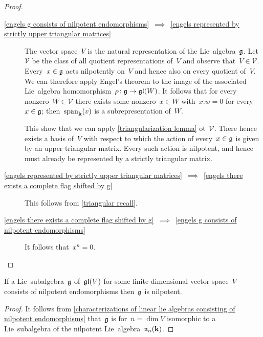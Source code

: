 \begin{proof}
  \leavevmode
  \begin{description}
    \item[\ref*{engels g consists of nilpotent endomorphisms}~$\implies$~\ref*{engels represented by strictly upper triangular matrices}]
      The vector space~$V$ is the natural representation of the Lie~algebra~$\mathfrak{g}$.
      Let~$\mathcal{V}$ be the class of all quotient representations of~$V$ and observe that~$V \in \mathcal{V}$.
      Every~$x \in \mathfrak{g}$ acts nilpotently on~$V$ and hence also on every quotient of~$V$.
      We can therefore apply Engel’s theorem to the image of the associated Lie~algebra homomorphism~$\rho \colon \mathfrak{g} \to \mathfrak{gl}(W)$.
      It follows that for every nonzero~$W \in \mathcal{V}$ there exists some nonzero~$x \in W$ with~$x.w = 0$ for every~$x \in \mathfrak{g}$;
      then~$\operatorname{span}_{\mathbf{k}}(v)$ is a {\onedimensional} subrepresentation of~$W$.
      
      This show that we can apply \cref{triangularization lemma} ot~$\mathcal{V}$.
      There hence exists a basis of~$V$ with respect to which the action of every~$x \in \mathfrak{g}$ is given by an upper triangular matrix.
      Every such action is nilpotent, and hence must already be represented by a strictly triangular matrix.
    \item[\ref*{engels represented by strictly upper triangular matrices}~$\implies$~\ref*{engels there exists a complete flag shifted by g}]
      This follows from \cref{triangular recall}.
    \item[\ref*{engels there exists a complete flag shifted by g}~$\implies$~\ref*{engels g consists of nilpotent endomorphisms}]
      It follows that~$x^n = 0$.
    \qedhere
  \end{description}
\end{proof}


\begin{corollary}
  \label{linear lie algebras consisting of nilpotent endomorphisms are nilpotent}
  If a Lie~subalgebra~$\mathfrak{g}$ of~$\mathfrak{gl}(V)$ for some finite dimensional vector space~$V$ consists of nilpotent endomorphisms then~$\mathfrak{g}$ is nilpotent.
\end{corollary}


\begin{proof}
  It follows from \cref{characterizations of linear lie algebras consisting of nilpotent endomorphisms} that~$\mathfrak{g}$ is for~$n = \dim V$ isomorphic to a Lie~subalgebra of the nilpotent Lie~algebra~$\mathfrak{n}_n(\mathbf{k})$.
\end{proof}


